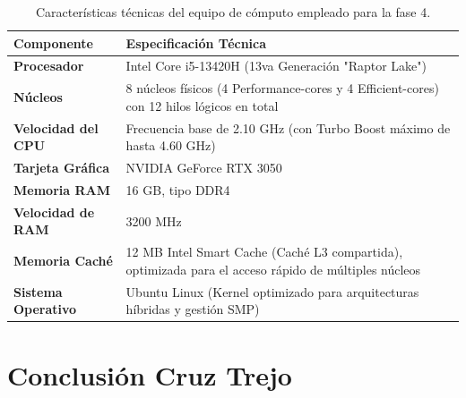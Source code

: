 \begin{table}[H]
\centering
\renewcommand{\arraystretch}{1.3}
\begin{tabular}{|l|p{10cm}|}
\hline
\textbf{Componente} & \textbf{Especificación Técnica} \\ \hline
\textbf{Procesador} & Intel Core i5-13420H (13va Generación "Raptor Lake") \\ \hline
\textbf{Núcleos} & 8 núcleos físicos (4 Performance-cores y 4 Efficient-cores) con 12 hilos lógicos en total \\ \hline
\textbf{Velocidad del CPU} & Frecuencia base de 2.10 GHz (con Turbo Boost máximo de hasta 4.60 GHz) \\ \hline
\textbf{Tarjeta Gráfica} & NVIDIA GeForce RTX 3050 \\ \hline
\textbf{Memoria RAM} & 16 GB, tipo DDR4 \\ \hline
\textbf{Velocidad de RAM} & 3200 MHz \\ \hline
\textbf{Memoria Caché} & 12 MB Intel Smart Cache (Caché L3 compartida), optimizada para el acceso rápido de múltiples núcleos \\ \hline
\textbf{Sistema Operativo} & Ubuntu Linux (Kernel optimizado para arquitecturas híbridas y gestión SMP) \\ \hline
\end{tabular}
\caption{Características técnicas del equipo de cómputo empleado para la fase 4.}
\label{tab:hardware_specs}
\end{table}

\clearpage

\section*{Conclusión Cruz Trejo}

